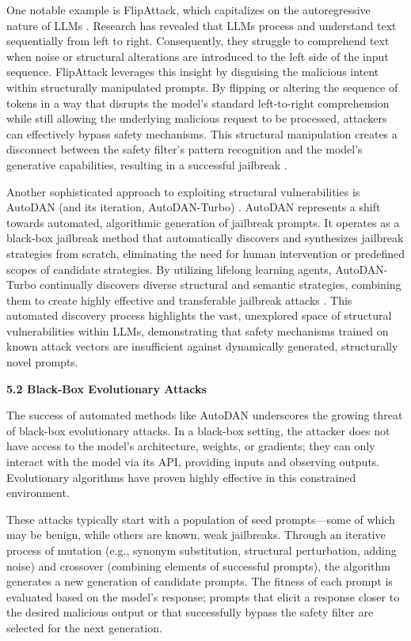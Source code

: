 \documentclass[11pt,a4paper]{article}
\begin{document}
One notable example is FlipAttack, which capitalizes on the autoregressive nature of LLMs \cite{Liu_2024_Flipattack}. Research has revealed that LLMs process and understand text sequentially from left to right. Consequently, they struggle to comprehend text when noise or structural alterations are introduced to the left side of the input sequence. FlipAttack leverages this insight by disguising the malicious intent within structurally manipulated prompts. By flipping or altering the sequence of tokens in a way that disrupts the model's standard left-to-right comprehension while still allowing the underlying malicious request to be processed, attackers can effectively bypass safety mechanisms. This structural manipulation creates a disconnect between the safety filter's pattern recognition and the model's generative capabilities, resulting in a successful jailbreak \cite{Liu_2024_Flipattack}.

Another sophisticated approach to exploiting structural vulnerabilities is AutoDAN (and its iteration, AutoDAN-Turbo) \cite{Liu_2024_Autodan}. AutoDAN represents a shift towards automated, algorithmic generation of jailbreak prompts. It operates as a black-box jailbreak method that automatically discovers and synthesizes jailbreak strategies from scratch, eliminating the need for human intervention or predefined scopes of candidate strategies. By utilizing lifelong learning agents, AutoDAN-Turbo continually discovers diverse structural and semantic strategies, combining them to create highly effective and transferable jailbreak attacks \cite{Liu_2024_Autodan}. This automated discovery process highlights the vast, unexplored space of structural vulnerabilities within LLMs, demonstrating that safety mechanisms trained on known attack vectors are insufficient against dynamically generated, structurally novel prompts.

\textbf{5.2 Black-Box Evolutionary Attacks}

The success of automated methods like AutoDAN underscores the growing threat of black-box evolutionary attacks. In a black-box setting, the attacker does not have access to the model's architecture, weights, or gradients; they can only interact with the model via its API, providing inputs and observing outputs. Evolutionary algorithms have proven highly effective in this constrained environment.

These attacks typically start with a population of seed prompts---some of which may be benign, while others are known, weak jailbreaks. Through an iterative process of mutation (e.g., synonym substitution, structural perturbation, adding noise) and crossover (combining elements of successful prompts), the algorithm generates a new generation of candidate prompts. The fitness of each prompt is evaluated based on the model's response; prompts that elicit a response closer to the desired malicious output or that successfully bypass the safety filter are selected for the next generation.
\end{document}
